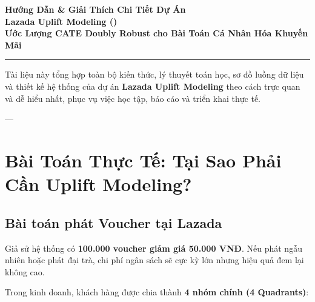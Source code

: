 \documentclass[11pt,a4paper]{article}
\begin{document}
\begin{center}
    {\LARGE \bfseries Hướng Dẫn \& Giải Thích Chi Tiết Dự Án\\[0.3em] Lazada Uplift Modeling ()}\\[0.8em]
    {\large \color{primary}\bfseries Ước Lượng CATE Doubly Robust cho Bài Toán Cá Nhân Hóa Khuyến Mãi}\\[0.5em]
    \rule{\textwidth}{1pt}
\end{center}

Tài liệu này tổng hợp toàn bộ kiến thức, lý thuyết toán học, sơ đồ luồng dữ liệu và thiết kế hệ thống của dự án \textbf{Lazada Uplift Modeling} theo cách trực quan và dễ hiểu nhất, phục vụ việc học tập, báo cáo và triển khai thực tế.

---

\section{Bài Toán Thực Tế: Tại Sao Phải Cần Uplift Modeling?}

\subsection{Bài toán phát Voucher tại Lazada}
Giả sử hệ thống có \textbf{100.000 voucher giảm giá 50.000 VNĐ}. Nếu phát ngẫu nhiên hoặc phát đại trà, chi phí ngân sách sẽ cực kỳ lớn nhưng hiệu quả đem lại không cao.

Trong kinh doanh, khách hàng được chia thành \textbf{4 nhóm chính (4 Quadrants)}:
\end{document}
